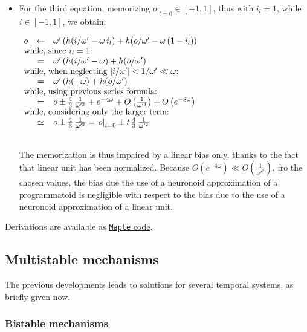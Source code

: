 \documentclass[a4]{article}
\newcommand{\eqline}[1]{~\vspace{0.1cm}\\\centerline{$#1$}\vspace{0.1cm}\\}
\begin{document}
\begin{itemize}
\item For the third equation, memorizing $\left.o\right|_{t=0} \in [-1, 1]$, thus with $i_l = 1$, while $i  \in [-1, 1]$, we obtain:
\eqline{\begin{array}{rcl}
    o &\leftarrow& \omega' \, (h(i/\omega' -  \omega \, i_l) + h(o /\omega' -  \omega \, (1 - i_l)) \\
    \multicolumn{3}{l}{\mbox{while, since $i_l = 1$:}} \\
    &=& \omega' \, (h(i/\omega' -  \omega) + h(o /\omega') \\
    \multicolumn{3}{l}{\mbox{while, when neglecting $|i/\omega'| < 1/\omega' \ll \omega$:}} \\
    &=& \omega' \, (h(-\omega) + h(o /\omega') \\
    \multicolumn{3}{l}{\mbox{while, using previous series formula:}} \\
    &=& o \pm \frac{4}{3} \, \frac{1}{\omega'^2} + e^{-4 \omega} + O\left(\frac{1}{\omega'^4}\right) + O\left(e^{-8 \omega}\right) \\
     \multicolumn{3}{l}{\mbox{while, considering only the larger term:}} \\
    &\simeq& o \pm \frac{4}{3} \, \frac{1}{\omega'^2}  = \left.o\right|_{t=0} \pm t \, \frac{4}{3} \, \frac{1}{\omega'^2} \\
 \end{array}}
The memorization is thus impaired by a linear bias only, thanks to the fact that linear unit has been normalized. Because $O\left(e^{-4 \omega}\right) \ll O\left(\frac{1}{\omega'^2}\right)$, fro the chosen values, the bias due the use of a neuronoid approximation of a programmatoid is negligible with respect to the bias due to the use of a neuronoid approximation of a linear unit.
\end{itemize}

Derivations are available as \href{https://raw.githubusercontent.com/vthierry/braincraft/master/doc/tex/memorygate.mpl.out.txt}{{\tt Maple} code}.

\subsection{Multistable mechanisms}

The previous developments leads to solutions for several temporal systems, as briefly given now.

\subsubsection{Bistable mechanisms}
\end{document}

